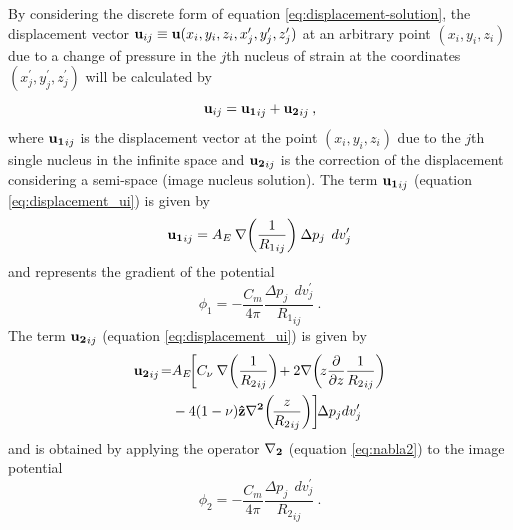 \documentclass[P]{BrJG_submit}
\begin{document}
By considering the discrete form of equation \ref{eq:displacement-solution}, the displacement vector  $ {\bf{u}}_{ij} \equiv  {\bf{u}}(x_{i}, y_{i}, z_{i}, x^{\prime}_{j}, y^{\prime}_{j}, z^{\prime}_{j})$ at an arbitrary point $(x_{i}, y_{i}, z_{i})$ due to a change of pressure in the $j$th nucleus of strain at the coordinates $(x^{\prime}_{j}, y^{\prime}_{j}, z^{\prime}_{j})$ will be calculated by
\begin{equation}
{\bf{u}}_{ij}  = {\bf{u_{1}}}_{ij} + {\bf{u_{2}}}_{ij} \: ,
\label{eq:displacement_ui}
\end{equation}
where ${\bf{u_{1}}}_{ij}$ is the displacement vector at the point $(x_{i}, y_{i}, z_{i})$ due to the $j$th single nucleus in the infinite space and ${\bf{u_{2}}}_{ij}$ 
is the correction of the displacement considering a semi-space (image nucleus solution).
The term ${\bf{u_{1}}}_{ij}$ (equation \ref{eq:displacement_ui}) is given by
\begin{equation}
{\bf{u_{1}}}_{ij} = A_{E} \: {\bf{\nabla}} \bigg( {\frac{1}{{R_1}_{ij}}} \bigg) 
\: \Delta p_{j} \: \:dv_j^{\prime}
\label{eq:nucleus-u1}
\end{equation}
and represents the gradient of the potential
\begin{equation}
\phi_{1} = - \frac{C_m}{4 \pi}  \frac{\Delta p_{j} \: \:dv_j^{\prime}}{ {R_1}_{ij} } \: .
\label{eq:nucleus-phi1}
\end{equation}
The term ${\bf{u_{2}}}_{ij}$ (equation \ref{eq:displacement_ui}) is given by
\begin{equation}
\begin{aligned}
{\bf{u_{2}}}_{ij} \!=  & 
A_{E} \!
\bigg[ 
C_{\nu} \: {\bf{\nabla}} \bigg(  {\frac{1}{{R_2}_{ij}}} \bigg)     
\! + 2 {\bf{\nabla}} \bigg( \! z \frac{\partial }{\partial z} {\frac{1}{{R_2}_{ij}}} \bigg) \\  
& - 4(1- \nu){\bf{\hat{z}}} {\bf{{\nabla}^{2}}}  \bigg(\! {\frac{z}{{R_2}_{ij}}} \bigg)
\bigg] \! \Delta p_{j}  dv_j^{\prime}
\end{aligned}
\label{eq:nucleus-u2}
\end{equation}
and is obtained by applying the operator ${\bf{{\nabla}_{2}}}$ (equation 
\ref{eq:nabla2}) to the image potential
\begin{equation}
\phi_{2} = - \frac{C_m}{4 \pi}  \frac{\Delta p_{j} \: \:dv_j^{\prime}}{ {R_2}_{ij} } \: .
\label{eq:nucleus-phi2}
\end{equation}
\end{document}
